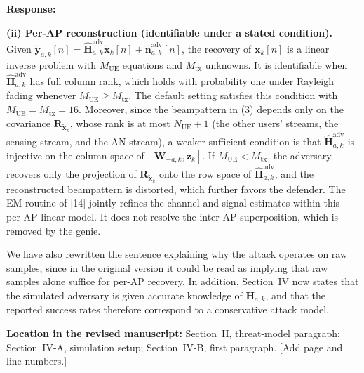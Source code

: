 \documentclass[a4paper,12pt]{article}
\newenvironment{response}{\par\textbf{Response:}\par}{\par}
\newcommand{\revisionlocation}[1]{\par\textbf{Location in the revised manuscript:} #1\par}
\begin{document}
\begin{response}
\textbf{(ii) Per-AP reconstruction (identifiable under a stated
condition).} Given
$\widetilde{\mathbf{y}}_{a,k}[n]=\widehat{\mathbf{H}}_{a,k}^{\mathrm{adv}}\widetilde{\mathbf{x}}_k[n]+\widetilde{\mathbf{n}}_{a,k}^{\mathrm{adv}}[n]$,
the recovery of $\widetilde{\mathbf{x}}_k[n]$ is a linear inverse problem
with $M_{\mathrm{UE}}$ equations and $M_{\mathrm{tx}}$ unknowns. It is
identifiable when $\widehat{\mathbf{H}}_{a,k}^{\mathrm{adv}}$ has full
column rank, which holds with probability one under Rayleigh fading whenever
$M_{\mathrm{UE}}\ge M_{\mathrm{tx}}$. The default setting satisfies this
condition with $M_{\mathrm{UE}}=M_{\mathrm{tx}}=16$. Moreover, since the
beampattern in (3) depends only on the covariance
$\mathbf{R}_{\widetilde{\mathbf{x}}_k}$, whose rank is at most
$N_{\mathrm{UE}}+1$ (the other users' streams, the sensing stream, and the AN
stream), a weaker sufficient condition is that
$\widehat{\mathbf{H}}_{a,k}^{\mathrm{adv}}$ is injective on the column space
of $[\mathbf{W}_{-a,k},\mathbf{z}_k]$. If $M_{\mathrm{UE}}<M_{\mathrm{tx}}$,
the adversary recovers only the projection of
$\mathbf{R}_{\widetilde{\mathbf{x}}_k}$ onto the row space of
$\widehat{\mathbf{H}}_{a,k}^{\mathrm{adv}}$, and the reconstructed
beampattern is distorted, which further favors the defender. The EM routine
of [14] jointly refines the channel and signal estimates within this per-AP
linear model. It does not resolve the inter-AP superposition, which is
removed by the genie.

We have also rewritten the sentence explaining why the attack operates on raw
samples, since in the original version it could be read as implying that raw
samples alone suffice for per-AP recovery. In addition, Section~IV now states
that the simulated adversary is given accurate knowledge of
$\mathbf{H}_{a,k}$, and that the reported success rates therefore
correspond to a conservative attack model.
\end{response}
\revisionlocation{Section~II, threat-model paragraph; Section~IV-A,
simulation setup; Section~IV-B, first paragraph. [Add page and line
numbers.]}
\end{document}
